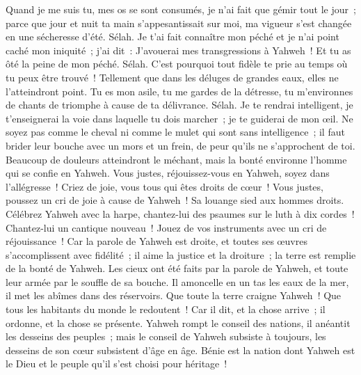 \begin{multicols}{2}
Quand je me suis tu, mes os se sont consumés, je n'ai fait que gémir tout le jour~;
parce que jour et nuit ta main s'appesantissait sur moi, ma vigueur s'est changée en une sécheresse d'été. Sélah.
Je t'ai fait connaître mon péché et je n'ai point caché mon iniquité~; j'ai dit~: J'avouerai mes transgressions à Yahweh~! Et tu as ôté la peine de mon péché. Sélah.
C'est pourquoi tout fidèle te prie au temps où tu peux être trouvé~! Tellement que dans les déluges de grandes eaux, elles ne l'atteindront point.
Tu es mon asile, tu me gardes de la détresse, tu m'environnes de chants de triomphe à cause de ta délivrance. Sélah.
Je te rendrai intelligent, je t'enseignerai la voie dans laquelle tu dois marcher~; je te guiderai de mon œil.
Ne soyez pas comme le cheval ni comme le mulet qui sont sans intelligence~; il faut brider leur bouche avec un mors et un frein, de peur qu'ils ne s'approchent de toi.
Beaucoup de douleurs atteindront le méchant, mais la bonté environne l'homme qui se confie en Yahweh.
Vous justes, réjouissez-vous en Yahweh, soyez dans l'allégresse~! Criez de joie, vous tous qui êtes droits de cœur~!
\VerseOne{}Vous justes, poussez un cri de joie à cause de Yahweh~! Sa louange sied aux hommes droits.
Célébrez Yahweh avec la harpe, chantez-lui des psaumes sur le luth à dix cordes~!
Chantez-lui un cantique nouveau~! Jouez de vos instruments avec un cri de réjouissance~!
Car la parole de Yahweh est droite, et toutes ses œuvres s'accomplissent avec fidélité~;
il aime la justice et la droiture~; la terre est remplie de la bonté de Yahweh.
Les cieux ont été faits par la parole de Yahweh, et toute leur armée par le souffle de sa bouche.
Il amoncelle en un tas les eaux de la mer, il met les abîmes dans des réservoirs.
Que toute la terre craigne Yahweh~! Que tous les habitants du monde le redoutent~!
Car il dit, et la chose arrive~; il ordonne, et la chose se présente.
Yahweh rompt le conseil des nations, il anéantit les desseins des peuples~;
mais le conseil de Yahweh subsiste à toujours, les desseins de son cœur subsistent d'âge en âge.
Bénie est la nation dont Yahweh est le Dieu et le peuple qu'il s'est choisi pour héritage~!

\end{multicols}
